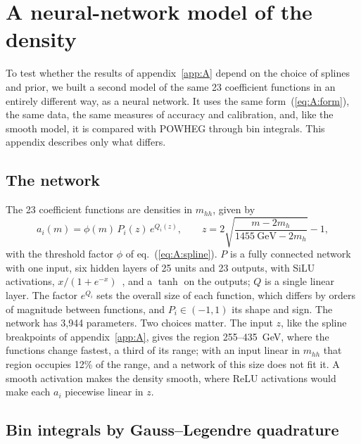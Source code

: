 \section{A neural-network model of the density}
\label{app:B}

To test whether the results of appendix~\ref{app:A} depend on the choice of splines and prior, we built a second
model of the same 23 coefficient functions in an entirely different way, as a neural network. It uses the same
form~(\ref{eq:A:form}), the same data, the same measures of accuracy and calibration, and, like the smooth model,
it is compared with POWHEG through bin integrals. This appendix describes only what differs.

\subsection{The network}
\label{app:B:network}

The 23 coefficient functions are densities in $m_{hh}$, given by
\begin{equation}
  a_i(m) = \phi(m)\,P_i(z)\,e^{Q_i(z)}, \qquad z = 2\sqrt{\frac{m - 2m_h}{1455~\text{GeV} - 2m_h}} - 1 ,
  \label{eq:B:net}
\end{equation}
with the threshold factor $\phi$ of eq.~(\ref{eq:A:spline}). $P$ is a fully connected network with one input, six
hidden layers of 25 units and 23 outputs, with SiLU activations, $x/(1 + e^{-x})$~\cite{Elfwing:2018,Hendrycks:2016},
and a $\tanh$ on the outputs; $Q$ is a single linear layer. The factor $e^{Q_i}$ sets the overall size of each
function, which differs by orders of magnitude between functions, and $P_i \in (-1,1)$ its shape and sign. The
network has 3,944 parameters. Two choices matter. The input $z$, like the spline breakpoints of
appendix~\ref{app:A}, gives the region 255--435~GeV, where the functions change fastest, a third of its range; with
an input linear in $m_{hh}$ that region occupies 12\% of the range, and a network of this size does not fit it. A
smooth activation makes the density smooth, where ReLU activations would make each $a_i$ piecewise linear in $z$.

\subsection{Bin integrals by Gauss--Legendre quadrature}
\label{app:B:quadrature}

